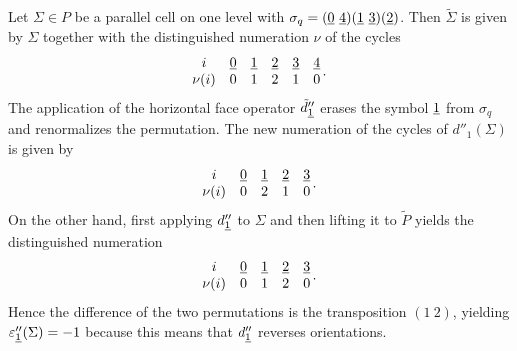 \begin{example}
Let $\Sigma \in P$ be a parallel cell on one level with $\sigma_q = (\underline{\smash{0}}\ \underline{\smash{4}}) (\underline{\smash{1}}\ \underline{\smash{3}}) (\underline{\smash{2}})$.
Then $\tilde \Sigma$ is given by $\Sigma$ together with the distinguished numeration $\nu$ of the cycles
\[
\begin{matrix}
i      & \underline{\smash{0}} & \underline{\smash{1}} & \underline{\smash{2}} & \underline{\smash{3}} & \underline{\smash{4}} \\
\nu(i) & 0 & 1 & 2 & 1 & 0
\end{matrix}\,.
\]
The application of the horizontal face operator $\tilde d''_{\underline{\smash{1}}}$ erases the symbol $\underline{\smash{1}}$ from $\sigma_q$
and renormalizes the permutation.
The new numeration of the cycles of $d''_1(\Sigma)$ is given by
\[
\begin{matrix}
i      & \underline{\smash{0}} & \underline{\smash{1}} & \underline{\smash{2}} & \underline{\smash{3}} \\
\nu(i) & 0 & 2 & 1 & 0
\end{matrix}\,.
\]
On the other hand, first applying $d''_{\underline{\smash{1}}}$ to $\Sigma$ and then lifting it to $\tilde P$ yields the distinguished numeration
\[
\begin{matrix}
i      & \underline{\smash{0}} & \underline{\smash{1}} & \underline{\smash{2}} & \underline{\smash{3}} \\
\nu(i) & 0 & 1 & 2 & 0
\end{matrix}\,.
\]
Hence the difference of the two permutations is the transposition $(1 \ 2)$, 
yielding $\varepsilon_{\underline{\smash{1}}}''(\Sigma) = -1$ because this means that $d''_{\underline{\smash{1}}}$ reverses orientations.
\end{example}

